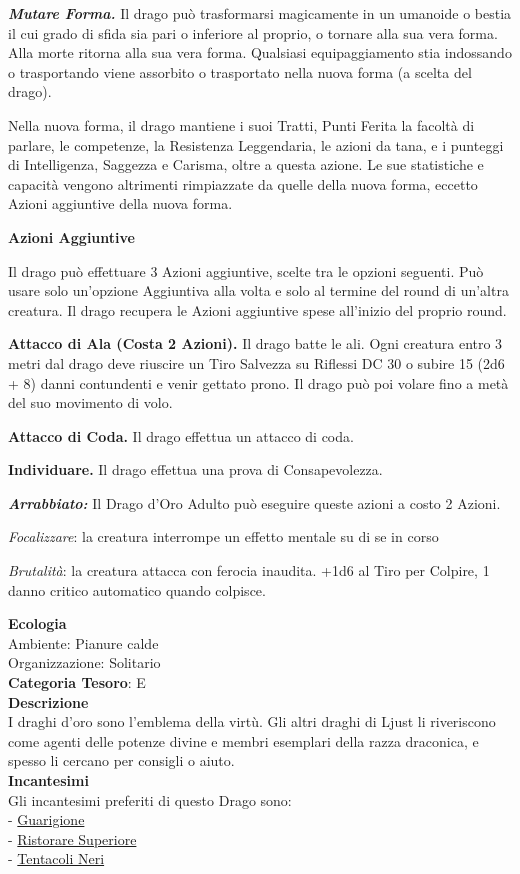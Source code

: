 \begin{multicols}{2}
{\emph{\textbf{Mutare Forma.}} Il drago può trasformarsi magicamente in un umanoide o bestia il cui grado di sfida sia pari o inferiore al proprio, o tornare alla sua vera forma. Alla morte ritorna alla sua vera forma. Qualsiasi equipaggiamento stia indossando o trasportando viene assorbito o trasportato nella nuova forma (a scelta del drago).

Nella nuova forma, il drago mantiene i suoi Tratti, Punti Ferita la facoltà di parlare, le competenze, la Resistenza Leggendaria, le azioni da tana, e i punteggi di Intelligenza, Saggezza e Carisma, oltre a questa azione. Le sue statistiche e capacità vengono altrimenti rimpiazzate da quelle della nuova forma, eccetto Azioni aggiuntive della nuova forma.

\textbf{Azioni Aggiuntive}

Il drago può effettuare 3 Azioni aggiuntive, scelte tra le opzioni seguenti. Può usare solo un'opzione Aggiuntiva alla volta e solo al termine del round di un'altra creatura. Il drago recupera le Azioni aggiuntive spese all'inizio del proprio round.

\textbf{Attacco di Ala (Costa 2 Azioni).} Il drago batte le ali. Ogni creatura entro 3 metri dal drago deve riuscire un Tiro Salvezza su Riflessi DC 30 o subire 15 (2d6 + 8) danni contundenti e venir gettato prono. Il drago può poi volare fino a metà del suo movimento di volo.

\textbf{Attacco di Coda.} Il drago effettua un attacco di coda.

\textbf{Individuare.} Il drago effettua una prova di Consapevolezza.

\emph{\textbf{Arrabbiato:}} Il Drago d'Oro Adulto può eseguire queste azioni a costo 2 Azioni.

\emph{Focalizzare}: la creatura interrompe un effetto mentale su di se in corso

\emph{Brutalità}: la creatura attacca con ferocia inaudita. +1d6 al Tiro per Colpire, 1 danno critico automatico quando colpisce.

\textbf{Ecologia}\\
Ambiente: Pianure calde\\
Organizzazione: Solitario\\
\textbf{Categoria Tesoro}: E\\
\textbf{Descrizione}\\
I draghi d'oro sono l'emblema della virtù. Gli altri draghi di Ljust li riveriscono come agenti delle potenze divine e membri esemplari della razza draconica, e spesso li cercano per consigli o aiuto.\\
\textbf{Incantesimi}\\
Gli incantesimi preferiti di questo Drago sono:\\
- \hyperlink{Guarigione}{Guarigione}\\
- \hyperlink{Ristorare Superiore}{Ristorare Superiore}\\
- \hyperlink{Tentacoli Neri}{Tentacoli Neri}

}
\end{multicols}
